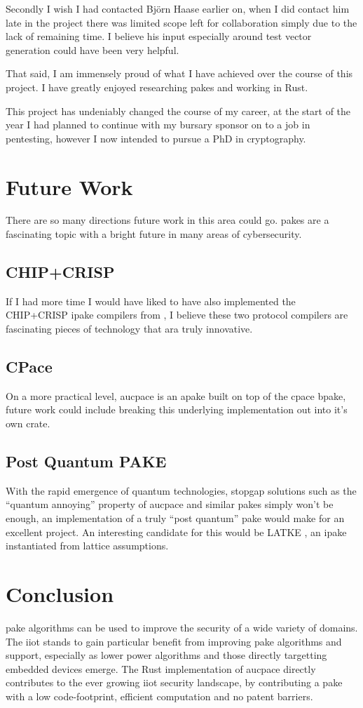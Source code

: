 Secondly I wish I had contacted Bj\"orn Haase earlier on, when I did contact him late in the project there was limited scope left for collaboration simply due to the lack of remaining time.
I believe his input especially around test vector generation could have been very helpful.

That said, I am immensely proud of what I have achieved over the course of this project.
I have greatly enjoyed researching \glspl{pake} and working in Rust.

This project has undeniably changed the course of my career, at the start of the year I had planned to continue with my bursary sponsor on to a job in pentesting, however I now intended to pursue a PhD in cryptography.

\section{Future Work}
There are so many directions future work in this area could go.
\glspl{pake} are a fascinating topic with a bright future in many areas of cybersecurity.

\subsection{CHIP+CRISP}
If I had more time I would have liked to have also implemented the CHIP+CRISP \gls{ipake} compilers from \citeauthor{chip+crisp}, I believe these two protocol compilers are fascinating pieces of technology that ara truly innovative.

\subsection{CPace}
On a more practical level, \gls{aucpace} is an \gls{apake} built on top of the \gls{cpace} \gls{bpake}, future work could include breaking this underlying implementation out into it's own crate.

\subsection{Post Quantum PAKE}
With the rapid emergence of quantum technologies, stopgap solutions such as the \enquote{quantum annoying} property of \gls{aucpace} and similar \glspl{pake} simply won't be enough, an implementation of a truly \enquote{post quantum} \gls{pake} would make for an excellent project.
An interesting candidate for this would be LATKE \cite{latke}, an \gls{ipake} instantiated from lattice assumptions.

\section{Conclusion}
\gls{pake} algorithms can be used to improve the security of a wide variety of domains.
The \gls{iiot} stands to gain particular benefit from improving \gls{pake} algorithms and support, especially as lower power algorithms and those directly targetting embedded devices emerge.
The Rust implementation of \gls{aucpace} directly contributes to the ever growing \gls{iiot} security landscape, by contributing a \gls{pake} with a low code-footprint, efficient computation and no patent barriers.
